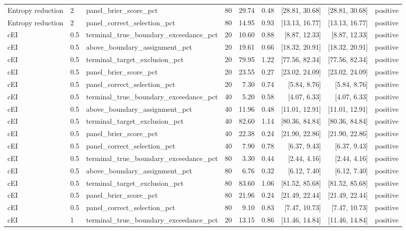 \begin{longtable}{lllrrrrrl}
Entropy reduction & 2 & panel\_brier\_score\_pct & 80 & 29.74 & 0.48 & [28.81, 30.68] & [28.81, 30.68] & positive \\
Entropy reduction & 2 & panel\_correct\_selection\_pct & 80 & 14.95 & 0.93 & [13.13, 16.77] & [13.13, 16.77] & positive \\
cEI & 0.5 & terminal\_true\_boundary\_exceedance\_pct & 20 & 10.60 & 0.88 & [8.87, 12.33] & [8.87, 12.33] & positive \\
cEI & 0.5 & above\_boundary\_assignment\_pct & 20 & 19.61 & 0.66 & [18.32, 20.91] & [18.32, 20.91] & positive \\
cEI & 0.5 & terminal\_target\_exclusion\_pct & 20 & 79.95 & 1.22 & [77.56, 82.34] & [77.56, 82.34] & positive \\
cEI & 0.5 & panel\_brier\_score\_pct & 20 & 23.55 & 0.27 & [23.02, 24.09] & [23.02, 24.09] & positive \\
cEI & 0.5 & panel\_correct\_selection\_pct & 20 & 7.30 & 0.74 & [5.84, 8.76] & [5.84, 8.76] & positive \\
cEI & 0.5 & terminal\_true\_boundary\_exceedance\_pct & 40 & 5.20 & 0.58 & [4.07, 6.33] & [4.07, 6.33] & positive \\
cEI & 0.5 & above\_boundary\_assignment\_pct & 40 & 11.96 & 0.48 & [11.01, 12.91] & [11.01, 12.91] & positive \\
cEI & 0.5 & terminal\_target\_exclusion\_pct & 40 & 82.60 & 1.14 & [80.36, 84.84] & [80.36, 84.84] & positive \\
cEI & 0.5 & panel\_brier\_score\_pct & 40 & 22.38 & 0.24 & [21.90, 22.86] & [21.90, 22.86] & positive \\
cEI & 0.5 & panel\_correct\_selection\_pct & 40 & 7.90 & 0.78 & [6.37, 9.43] & [6.37, 9.43] & positive \\
cEI & 0.5 & terminal\_true\_boundary\_exceedance\_pct & 80 & 3.30 & 0.44 & [2.44, 4.16] & [2.44, 4.16] & positive \\
cEI & 0.5 & above\_boundary\_assignment\_pct & 80 & 6.76 & 0.32 & [6.12, 7.40] & [6.12, 7.40] & positive \\
cEI & 0.5 & terminal\_target\_exclusion\_pct & 80 & 83.60 & 1.06 & [81.52, 85.68] & [81.52, 85.68] & positive \\
cEI & 0.5 & panel\_brier\_score\_pct & 80 & 21.96 & 0.24 & [21.49, 22.44] & [21.49, 22.44] & positive \\
cEI & 0.5 & panel\_correct\_selection\_pct & 80 & 9.10 & 0.83 & [7.47, 10.73] & [7.47, 10.73] & positive \\
cEI & 1 & terminal\_true\_boundary\_exceedance\_pct & 20 & 13.15 & 0.86 & [11.46, 14.84] & [11.46, 14.84] & positive \\

\end{longtable}
